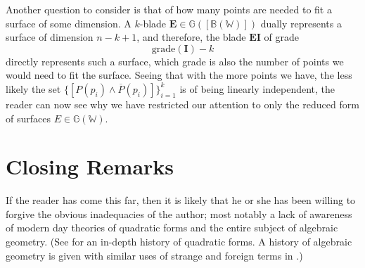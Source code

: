 \documentclass{birkjour}
\theoremstyle{definition}
\theoremstyle{remark}
\numberwithin{equation}{section}
\newcommand{\G}{\mathbb{G}}
\newcommand{\W}{\mathbb{W}}
\newcommand{\B}{\mathbb{B}}
\begin{document}
Another question to consider is that of how many points are needed
to fit a surface of some dimension.  A $k$-blade $\mathbf{E}\in\G([\B(\W)])$
dually represents a surface of dimension $n-k+1$, and therefore,
the blade $\mathbf{EI}$ of grade
\begin{equation}
\mbox{grade}(\mathbf{I})-k
\end{equation}
directly represents
such a surface, which grade is also the number of points we would need
to fit the surface.  Seeing that with the more points we have, the less likely
the set $\{[P(p_i)\wedge\overline{P}(p_i)]\}_{i=1}^k$ is of being linearly independent,
the reader can now see why
we have restricted our attention to only the reduced form of surfaces $E\in\G(\W)$.

\section{Closing Remarks}

If the reader has come this far, then it is likely that he or she has been willing
to forgive the obvious inadequacies of the author; most notably a lack of
awareness of modern day theories of quadratic forms and the entire subject of algebraic
geometry.  (See \cite{} for an in-depth history of quadratic forms.  A history
of algebraic geometry is given with similar uses of strange and foreign terms in \cite{}.)


\nocite{Dorst07}



\end{document}
